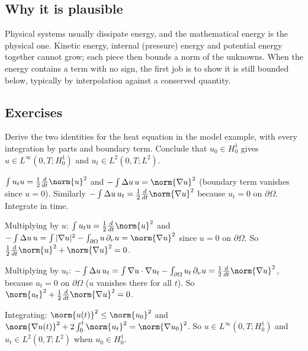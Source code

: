 \subsection*{Why it is plausible}

Physical systems usually dissipate energy, and the mathematical energy is the physical one. Kinetic energy, internal (pressure) energy and potential energy together cannot grow; each piece then bounds a norm of the unknowns. When the energy contains a term with no sign, the first job is to show it is still bounded below, typically by interpolation against a conserved quantity.

\subsection*{Exercises}

\begin{exercise}
  Derive the two identities for the heat equation in the model example, with every integration by parts and boundary term. Conclude that $u_0 \in H^1_0$ gives $u \in L^\infty(0,T;H^1_0)$ and $u_t \in L^2(0,T;L^2)$.
  \begin{hint}
    $\int u_t u = \frac12\frac{d}{dt}\norm{u}^2$ and $-\int\Delta u\,u = \norm{\nabla u}^2$ (boundary term vanishes since $u = 0$). Similarly $-\int\Delta u\,u_t = \frac12\frac{d}{dt}\norm{\nabla u}^2$ because $u_t = 0$ on $\partial\Omega$. Integrate in time.
  \end{hint}
  \begin{solution}
    Multiplying by $u$: $\int u_tu = \frac12\frac{d}{dt}\norm{u}^2$ and $-\int\Delta u\,u = \int|\nabla u|^2 - \int_{\partial\Omega}u\,\partial_\nu u = \norm{\nabla u}^2$ since $u = 0$ on $\partial\Omega$. So $\frac12\frac{d}{dt}\norm{u}^2 + \norm{\nabla u}^2 = 0$.

    Multiplying by $u_t$: $-\int\Delta u\,u_t = \int\nabla u\cdot\nabla u_t - \int_{\partial\Omega}u_t\,\partial_\nu u = \frac12\frac{d}{dt}\norm{\nabla u}^2$, because $u_t = 0$ on $\partial\Omega$ ($u$ vanishes there for all $t$). So $\norm{u_t}^2 + \frac12\frac{d}{dt}\norm{\nabla u}^2 = 0$.

    Integrating: $\norm{u(t)}^2 \le \norm{u_0}^2$ and $\norm{\nabla u(t)}^2 + 2\int_0^t\norm{u_t}^2 = \norm{\nabla u_0}^2$. So $u \in L^\infty(0,T;H^1_0)$ and $u_t \in L^2(0,T;L^2)$ when $u_0 \in H^1_0$.
  \end{solution}
\end{exercise}

